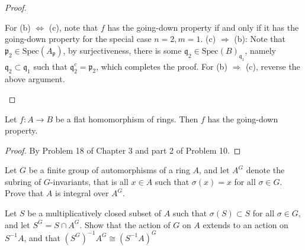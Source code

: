 \documentclass{solution}
\begin{document}
\begin{proof}
\begin{enumerate}
        For (b) $\Leftrightarrow$ (c), note that $f$ has the going-down property if and only if it has the going-down property for the special case $n = 2, m = 1$. (c) $\Rightarrow$ (b): Note that $\mathfrak{p}_2 \in \mathrm{Spec}(A_{\mathfrak{p}})$, by surjectiveness, there is some $\mathfrak{q}_2 \in \mathrm{Spec}(B)_{\mathfrak{q}_1}$, namely $\mathfrak{q}_2 \subset \mathfrak{q}_1$ such that $\mathfrak{q}^c_2 = \mathfrak{p}_2$, which completes the proof. For (b) $\Rightarrow$ (c), reverse the above argument.
    \end{enumerate}
\end{proof}

\begin{problem}
    Let $f: A \rightarrow B$ be a flat homomorphism of rings. Then $f$ has the going-down property.
\end{problem}

\begin{proof}
    By Problem 18 of Chapter 3 and part 2 of Problem 10.
\end{proof}

\begin{problem}
    Let $G$ be a finite group of automorphisms of a ring $A$, and let $A^G$ denote the subring of $G$-invariants, that is all $x \in A$ such that $\sigma(x) = x$ for all $\sigma \in G$. Prove that $A$ is integral over $A^G$.

    Let $S$ be a multiplicatively closed subset of $A$ such that $\sigma(S) \subset S$ for all $\sigma \in G$, and let $S^G = S \cap A^G$. Show that the action of $G$ on $A$ extends to an action on $S ^{-1} A$, and that $(S^G) ^{-1} A^G \cong(S ^{-1} A)^G$
\end{problem}
\end{document}
